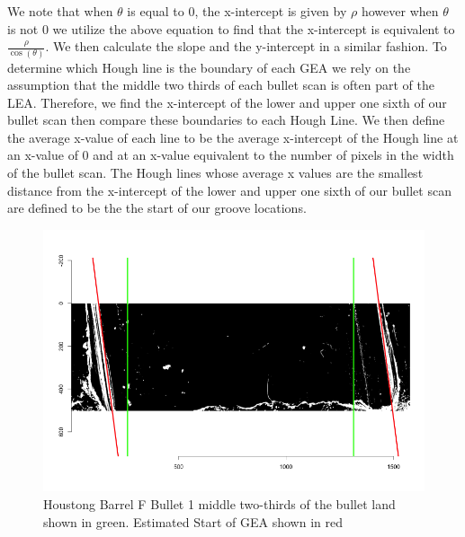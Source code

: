 \documentclass[12pt]{article}
\theoremstyle{nonumberplain}
\begin{document}
We note that when $\theta$ is equal to 0, the x-intercept is given by $\rho$ however when $\theta$ is not 0 we utilize the above equation to find that the x-intercept is equivalent to $\frac{\rho}{\cos(\theta)}$. We then calculate the slope and the y-intercept in a similar fashion. To determine which Hough line is the boundary of each GEA we rely on the assumption that the middle two thirds of each bullet scan is often part of the LEA. Therefore, we find the x-intercept of the lower and upper one sixth of our bullet scan then compare these boundaries to each Hough Line. We then define the average x-value of each line to be the average x-intercept of the Hough line at an x-value of 0 and at an x-value equivalent to the number of pixels in the width of the bullet scan. The Hough lines whose average x values are the smallest distance from the x-intercept of the lower and upper one sixth of our bullet scan are defined to be the the start of our groove locations. 

\begin{figure}[!ht]
  \centering
  \includegraphics[width = .9\textwidth]{../images/Hamby_252_Bullet1_Land3_BestFit}
  \caption{Houstong Barrel F Bullet 1 middle two-thirds of the bullet land shown in green. Estimated Start of GEA shown in red}
  \label{fig: midtwothird}
\end{figure}
\end{document}
